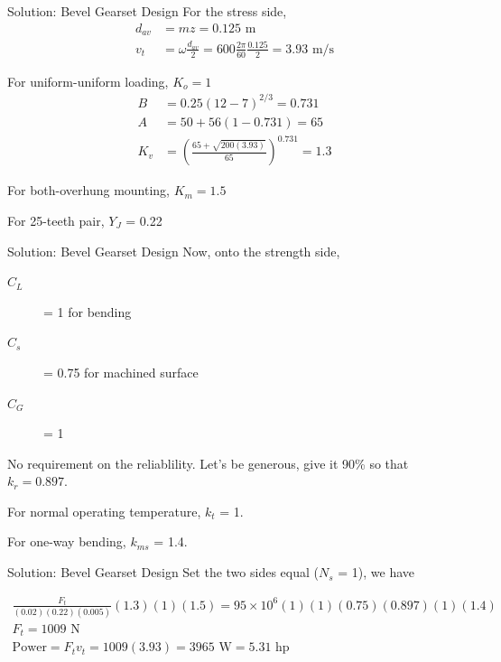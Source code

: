 \documentclass[10pt, svgnames]{beamer}
\begin{document}
\begin{frame}[label={sec:orgcebb517}]{Solution: Bevel Gearset Design}
For the stress side,
\begin{align*}
    d_{av} &= mz = 0.125 \text{ m} \\
    v_{t} &= \omega \frac{d_{av}}{2} = 600 \frac{2\pi}{60} \frac{0.125}{2} = 3.93 \text{ m/s}
\end{align*}

For uniform-uniform loading, \(K_{o} = 1\)
\begin{align*}
    B &= 0.25(12 - 7)^{2/3} = 0.731 \\
    A &= 50 + 56(1 - 0.731) = 65 \\
    K_{v} &= \left( \frac{65 + \sqrt{200(3.93)}}{65} \right)^{0.731} = 1.3
\end{align*}

For both-overhung mounting, \(K_{m} = 1.5\)

For 25-teeth pair, \(Y_{J}\) = 0.22
\end{frame}

\begin{frame}[label={sec:org8e3ebd1}]{Solution: Bevel Gearset Design}
Now, onto the strength side,

\begin{description}
\item[{\(C_L\)}] = 1 for bending

\item[{\(C_{s}\)}] = 0.75 for machined surface

\item[{\(C_{G}\)}] = 1
\end{description}

No requirement on the reliablility. Let's be generous, give it 90\% so
that \(k_{r} = 0.897\).

For normal operating temperature, \(k_{t}\) = 1.

For one-way bending, \(k_{ms}\) = 1.4.
\end{frame}

\begin{frame}[label={sec:orge44c906}]{Solution: Bevel Gearset Design}
Set the two sides equal (\(N_{s}\) = 1), we have

\begin{gather*}
    \frac{F_{t}}{(0.02)(0.22)(0.005)}(1.3)(1)(1.5) = 95 \times 10^{6} (1)(1)(0.75)(0.897)(1)(1.4) \\
    F_{t} = 1009 \text{ N} \\
    \text{Power} = F_{t}v_{t} = 1009(3.93) = 3965 \text{ W} = 5.31 \text{ hp}
\end{gather*}
\end{frame}
\end{document}
